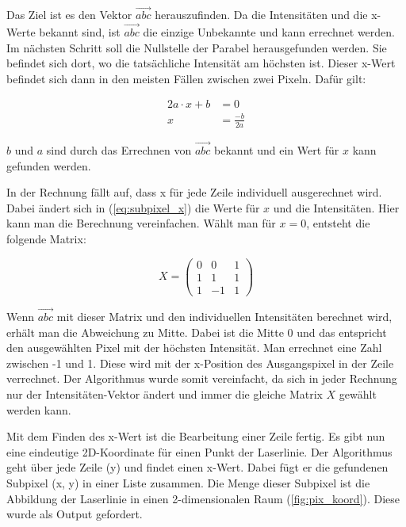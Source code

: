 	Das Ziel ist es den Vektor \( \vec{abc} \) herauszufinden. Da die Intensitäten und die x-Werte bekannt sind, ist \( \vec{abc} \) die einzige Unbekannte und kann errechnet werden. Im nächsten Schritt soll die Nullstelle der Parabel herausgefunden werden. Sie befindet sich dort, wo die tatsächliche Intensität am höchsten ist. Dieser x-Wert befindet sich dann in den meisten Fällen zwischen zwei Pixeln. Dafür gilt:
	
	\begin{equation}
	\begin{aligned}
	2a \cdot x + b &= 0 \\
	x &= \frac{-b}{2a}
	\end{aligned}
	\end{equation}
	
	\( b \) und \( a \) sind durch das Errechnen von \( \vec{abc} \) bekannt und ein Wert für \( x \) kann gefunden werden.
	
	In der Rechnung fällt auf, dass x für jede Zeile individuell ausgerechnet wird. Dabei ändert sich in (\ref{eq:subpixel_x}) die Werte für \( x \) und die Intensitäten. Hier kann man die Berechnung vereinfachen. Wählt man für \( x = 0\), entsteht die folgende Matrix:
	
	\begin{equation}
	X = \begin{pmatrix}
	0 & 0 & 1 \\
	1 & 1 & 1 \\
	1 & -1 & 1
	\end{pmatrix}
	\end{equation}
	
	Wenn \( \vec{abc} \) mit dieser Matrix und den individuellen Intensitäten berechnet wird, erhält man die Abweichung zu Mitte. Dabei ist die Mitte 0 und das entspricht den ausgewählten Pixel mit der höchsten Intensität. Man errechnet eine Zahl zwischen -1 und 1. Diese wird mit der x-Position des Ausgangspixel in der Zeile verrechnet. Der Algorithmus wurde somit vereinfacht, da sich in jeder Rechnung nur der Intensitäten-Vektor ändert und immer die gleiche Matrix \( X \) gewählt werden kann.
	
	Mit dem Finden des x-Wert ist die Bearbeitung einer Zeile fertig. Es gibt nun eine eindeutige 2D-Koordinate für einen Punkt der Laserlinie. Der Algorithmus geht über jede Zeile (y) und findet einen x-Wert. Dabei fügt er die gefundenen Subpixel (x, y) in einer Liste zusammen. Die Menge dieser Subpixel ist die Abbildung der Laserlinie in einen 2-dimensionalen Raum (\ref{fig:pix_koord}). Diese wurde als Output gefordert.
	\newpage
	
